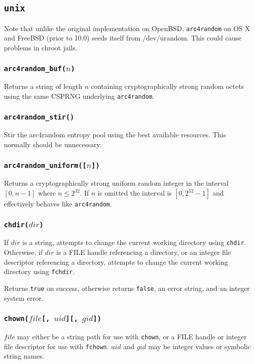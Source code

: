 \documentclass[11pt, oneside]{memoir}
\newcommand*{\true}[0]{\texttt{true}\xspace}
\newcommand*{\false}[0]{\texttt{false}\xspace}
\newcommand*{\syscall}[1]{\texttt{#1}\xspace}
\newcommand*{\fn}[1]{\texttt{#1}\xspace}
\newcounter{toccols}
\newenvironment{Module}[1]{
	\subsection{\texttt{#1}}
	\addtocontents{toc}{
		\protect\begin{multicols}{\value{toccols}}
	}
}{
	\addtocontents{toc}{\protect\end{multicols}}
}
\begin{document}
\begin{Module}{unix}
Note that unlike the original implementation on OpenBSD, \fn{arc4random} on OS X and FreeBSD (prior to 10.0) seeds itself from /dev/urandom. This could cause problems in chroot jails.

\subsubsection[\fn{arc4random\_buf}]{\fn{arc4random\_buf($n$)}}

Returns a string of length $n$ containing cryptographically strong random octets using the same CSPRNG underlying \fn{arc4random}.

\subsubsection[\fn{arc4random\_stir}]{\fn{arc4random\_stir()}}

Stir the arc4random entropy pool using the best available resources. This normally should be unnecessary.

\subsubsection[\fn{arc4random\_uniform}]{\fn{arc4random\_uniform([$n$])}}

Returns a cryptographically strong uniform random integer in the interval $[0, n-1]$ where $n \leq 2^{32}$. If $n$ is omitted the interval is $[0, 2^{32}-1]$ and effectively behaves like \fn{arc4random}.

\subsubsection[\fn{chdir}]{\fn{chdir($dir$)}}

If $dir$ is a string, attempts to change the current working directory using \syscall{chdir}. Otherwise, if $dir$ is a FILE handle referencing a directory, or an integer file descriptor referencing a directory, attempts to change the current working directory using \syscall{fchdir}.

Returns \true on success, otherwise returns \false, an error string, and an integer system error.

\subsubsection[\fn{chown}]{\fn{chown($file$[, $uid$][, $gid$])}}

$file$ may either be a string path for use with \syscall{chown}, or a FILE handle or integer file descriptor for use with \syscall{fchown}. $uid$ and $gid$ may be integer values or symbolic string names.


\end{Module}
\end{document}
